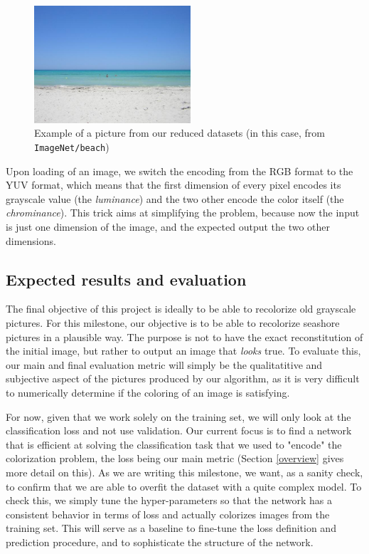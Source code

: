 \documentclass[10pt,twocolumn,letterpaper]{article}
\begin{document}
\begin{figure}
\begin{center}
\includegraphics[width=220px]{img/beach.jpg}
\caption{Example of a picture from our reduced datasets (in this case, from \texttt{ImageNet/beach})}
\label{inex}
\end{center}
\end{figure}

Upon loading of an image, we switch the encoding from the RGB format to the YUV format, which means that the first dimension of every pixel encodes its grayscale value (the \textit{luminance}) and the two other encode the color itself (the \textit{chrominance}). This trick aims at simplifying the problem, because now the input is just one dimension of the image, and the expected output the two other dimensions.

\subsection{Expected results and evaluation}


The final objective of this project is ideally to be able to recolorize old grayscale pictures. For this milestone, our objective is to be able to recolorize seashore pictures in a plausible way. The purpose is not to have the exact reconstitution of the initial image, but rather to output an image that \textit{looks} true. To evaluate this, our main and final evaluation metric will simply be the qualitatitive and subjective aspect of the pictures produced by our algorithm, as it is very difficult to numerically determine if the coloring of an image is satisfying.

For now, given that we work solely on the training set, we will only look at the classification loss and not use validation. Our current focus is to find a network that is efficient at solving the classification task that we used to "encode" the colorization problem, the loss being our main metric (Section \ref{overview} gives more detail on this). As we are writing this milestone, we want, as a sanity check, to confirm that we are able to overfit the dataset with a quite complex model. To check this, we simply tune the hyper-parameters so that the network has a consistent behavior in terms of loss and actually colorizes images from the training set.
This will serve as a baseline to fine-tune the loss definition and prediction procedure, and to sophisticate the structure of the network.
\end{document}
